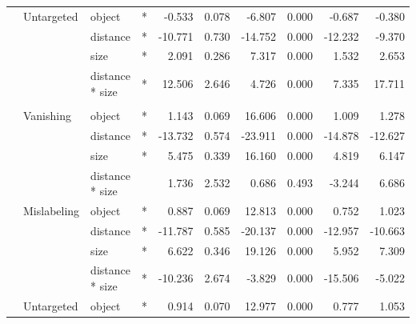 \documentclass[
]{article}
\begin{document}
\begin{longtable}[t]{llllrrrrrr}
\cmidrule{2-10}\nopagebreak
\hspace{1em} & Untargeted & object & * & -0.533 & 0.078 & -6.807 & 0.000 & -0.687 & -0.380\\
\cmidrule{3-10}\nopagebreak
\hspace{1em} &  & distance & * & -10.771 & 0.730 & -14.752 & 0.000 & -12.232 & -9.370\\
\cmidrule{3-10}\nopagebreak
\hspace{1em} &  & size & * & 2.091 & 0.286 & 7.317 & 0.000 & 1.532 & 2.653\\
\cmidrule{3-10}\nopagebreak
\hspace{1em} &  & distance * size & * & 12.506 & 2.646 & 4.726 & 0.000 & 7.335 & 17.711\\
\cmidrule{1-10}\pagebreak[0]
\addlinespace[0.3em]
\multicolumn{10}{l}{\textbf{SSD}}\\
\hspace{1em} & Vanishing & object & * & 1.143 & 0.069 & 16.606 & 0.000 & 1.009 & 1.278\\
\cmidrule{3-10}\nopagebreak
\hspace{1em} &  & distance & * & -13.732 & 0.574 & -23.911 & 0.000 & -14.878 & -12.627\\
\cmidrule{3-10}\nopagebreak
\hspace{1em} &  & size & * & 5.475 & 0.339 & 16.160 & 0.000 & 4.819 & 6.147\\
\cmidrule{3-10}\nopagebreak
\hspace{1em} &  & distance * size &  & 1.736 & 2.532 & 0.686 & 0.493 & -3.244 & 6.686\\
\cmidrule{2-10}\nopagebreak
\hspace{1em} & Mislabeling & object & * & 0.887 & 0.069 & 12.813 & 0.000 & 0.752 & 1.023\\
\cmidrule{3-10}\nopagebreak
\hspace{1em} &  & distance & * & -11.787 & 0.585 & -20.137 & 0.000 & -12.957 & -10.663\\
\cmidrule{3-10}\nopagebreak
\hspace{1em} &  & size & * & 6.622 & 0.346 & 19.126 & 0.000 & 5.952 & 7.309\\
\cmidrule{3-10}\nopagebreak
\hspace{1em} &  & distance * size & * & -10.236 & 2.674 & -3.829 & 0.000 & -15.506 & -5.022\\
\cmidrule{2-10}\nopagebreak
\hspace{1em} & Untargeted & object & * & 0.914 & 0.070 & 12.977 & 0.000 & 0.777 & 1.053\\

\end{longtable}
\end{document}

